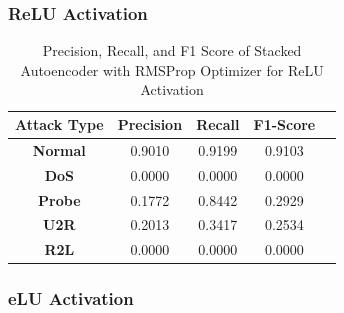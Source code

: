 \documentclass[12pt, a4paper]{report}
\begin{document}
\subsubsection{ReLU Activation}
\begin{table}[ht]
\centering
\captionsetup{justification=centering,margin=2cm}
\begin{tabular}{|c|c|c|c|c|}
\hline
\multicolumn{1}{|c|}{\textbf{Attack Type}} & \multicolumn{1}{c|}{\textbf{Precision}} & \multicolumn{1}{c|}{\textbf{Recall}} & \multicolumn{1}{c|}{\textbf{F1-Score}} \\ \hline
\textbf{Normal}        & 0.9010                                   & 0.9199                                & 0.9103                                                                  \\ \hline
\textbf{DoS}           & 0.0000                                  & 0.0000                                &  0.0000                                                                    \\ \hline
\textbf{Probe}         & 0.1772                                  & 0.8442                                & 0.2929                                                                  \\ \hline
\textbf{U2R}           & 0.2013                                    & 0.3417                                & 0.2534                                                                   \\ \hline
\textbf{R2L}           & 0.0000                                      & 0.0000                                   & 0.0000                                                            \\ \hline         \end{tabular}
\caption{Precision, Recall, and F1 Score of Stacked Autoencoder with RMSProp Optimizer for ReLU Activation}
\label{prf1_rmsprop_relu_auto}
\end{table}

\subsubsection{eLU Activation}
\end{document}

